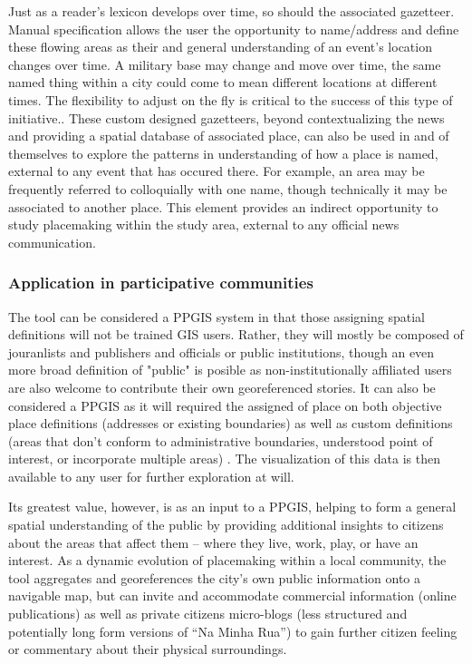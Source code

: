 Just as a reader’s lexicon develops over time, so should the associated gazetteer.  Manual specification allows the user the opportunity to name/address and define these flowing areas as their and general understanding of an event’s location changes over time. A military base may change and move over time, the same named thing within a city could come to mean different locations at different times. The flexibility to adjust on the fly is critical to the success of this type of initiative.\cite{Lieberman2010}.  These custom designed gazetteers, beyond contextualizing the news and providing a spatial database of associated place, can also be used in and of themselves to explore the patterns in understanding of how a place is named, external to any event that has occured there. For example, an area may be frequently referred to colloquially with one name, though technically it may be associated to another place. This element provides an indirect opportunity to study placemaking within the study area, external to any official news communication.

\subsubsection{Application in participative communities}
The tool can be considered a PPGIS system in that those assigning spatial definitions will not be trained GIS users. Rather, they will mostly be composed of jouranlists and publishers and officials or public institutions, though an even more broad definition of "public" is posible as non-institutionally affiliated users are also welcome to contribute their own georeferenced stories.  It can also be considered a PPGIS as it will required the assigned of place on both objective place definitions (addresses or existing boundaries) as well as custom definitions (areas that don't conform to administrative boundaries, understood point of interest, or incorporate multiple areas) \cite{Brown2012}. The visualization of this data is then available to any user for further exploration at will. %

Its greatest value, however, is as an input to a PPGIS, helping to form a general spatial understanding of the public by providing additional insights to citizens about the areas that affect them -- where they live, work, play, or have an interest. %
As a dynamic evolution of placemaking within a local community, the tool aggregates and georeferences the city’s own public information onto a navigable map, but can invite and accommodate commercial information (online publications) as well as private citizens micro-blogs (less structured and potentially long form versions of “Na Minha Rua”) to gain further citizen feeling or commentary about their physical surroundings. %

